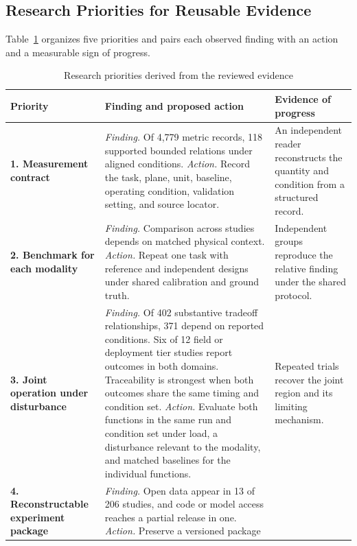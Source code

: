 \subsection{Research Priorities for Reusable Evidence}

Table~\ref{tab:research_roadmap} organizes five priorities and pairs each
observed finding with an action and a measurable sign of progress.

\begin{table}[!t]
\caption{Research priorities derived from the reviewed evidence}
\label{tab:research_roadmap}
\centering
\footnotesize
\setlength{\tabcolsep}{2.4pt}
\renewcommand{\arraystretch}{1.02}
\begin{tabularx}{\columnwidth}{@{}
>{\raggedright\arraybackslash}p{}
>{\raggedright\arraybackslash}X
>{\raggedright\arraybackslash}p{}@{}}
\toprule
Priority & Finding and proposed action & Evidence of progress \\
\midrule
\textbf{1. Measurement contract} &
\emph{Finding.} Of 4,779 metric records, 118 supported bounded relations under
aligned conditions. \emph{Action.} Record the task, plane, unit, baseline,
operating condition, validation setting, and source locator. &
An independent reader reconstructs the quantity and condition from a structured
record. \\
\addlinespace[1.5pt]
\textbf{2. Benchmark for each modality} &
\emph{Finding.} Comparison across studies depends on matched physical context.
\emph{Action.} Repeat one task with reference and independent designs under
shared calibration and ground truth. &
Independent groups reproduce the relative finding under the shared protocol. \\
\addlinespace[1.5pt]
\textbf{3. Joint operation under disturbance} &
\emph{Finding.} Of 402 substantive tradeoff relationships, 371 depend on
reported conditions. Six of 12 field or deployment tier studies report
outcomes in both domains. Traceability is strongest when both outcomes share
the same timing and condition set.
\emph{Action.} Evaluate both functions in the same run and condition set under
load, a disturbance relevant to the modality, and matched baselines for the
individual functions. &
Repeated trials recover the joint region and its limiting mechanism. \\
\addlinespace[1.5pt]
\textbf{4. Reconstructable experiment package} &
\emph{Finding.} Open data appear in 13 of 206 studies, and code or model access
reaches a partial release in one. \emph{Action.} Preserve a versioned package

\end{tabularx}
\end{table}
